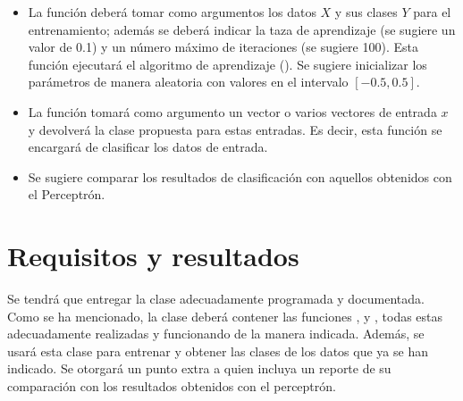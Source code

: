 \begin{itemize}
    \item La función  deberá tomar como argumentos los datos $X$ y sus clases $Y$ para el entrenamiento; además se deberá indicar la taza de aprendizaje (se sugiere un valor de 0.1) y un número máximo de iteraciones (se sugiere 100). Esta función ejecutará el algoritmo de aprendizaje (). Se sugiere inicializar los parámetros de manera aleatoria con valores en el intervalo $[-0.5,0.5]$.

    \item La función  tomará como argumento un vector o varios vectores de entrada $x$ y devolverá la clase propuesta para estas entradas. Es decir, esta función se encargará de clasificar los datos de entrada.

    \item Se sugiere comparar los resultados de clasificación con aquellos obtenidos con el Perceptrón. 
\end{itemize}


\section{Requisitos y resultados}

Se tendrá que entregar la clase  adecuadamente programada y documentada. Como se ha mencionado, la clase deberá contener las funciones ,  y , todas estas adecuadamente realizadas y funcionando de la manera indicada. Además, se usará esta clase para entrenar y obtener las clases de los datos que ya se han indicado.  Se otorgará un punto extra a quien incluya un reporte de su comparación con los resultados obtenidos con el perceptrón.
